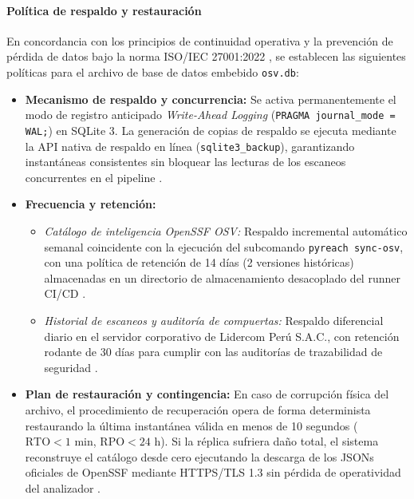 \paragraph*{Política de respaldo y restauración}
En concordancia con los principios de continuidad operativa y la prevención de pérdida de datos bajo la norma ISO/IEC 27001:2022 \cite{gutierrez2024auditoria, sommerville2016software}, se establecen las siguientes políticas para el archivo de base de datos embebido \texttt{osv.\allowbreak db}:

\begin{itemize}
    \item \textbf{Mecanismo de respaldo y concurrencia:} Se activa permanentemente el modo de registro anticipado \textit{Write-Ahead Logging} (\texttt{PRAGMA journal\_\allowbreak mode = WAL;}) en SQLite 3. La generación de copias de respaldo se ejecuta mediante la API nativa de respaldo en línea (\texttt{sqlite3\_\allowbreak backup}), garantizando instantáneas consistentes sin bloquear las lecturas de los escaneos concurrentes en el pipeline \cite{torres2026proyecto}.
    \item \textbf{Frecuencia y retención:}
    \begin{itemize}
        \item \textit{Catálogo de inteligencia OpenSSF OSV:} Respaldo incremental automático semanal coincidente con la ejecución del subcomando \texttt{pyreach sync-\allowbreak osv}, con una política de retención de 14 días (2 versiones históricas) almacenadas en un directorio de almacenamiento desacoplado del runner CI/CD \cite{openssf2023osv, gutierrez2024auditoria}.
        \item \textit{Historial de escaneos y auditoría de compuertas:} Respaldo diferencial diario en el servidor corporativo de Lidercom Perú S.A.C., con retención rodante de 30 días para cumplir con las auditorías de trazabilidad de seguridad \cite{gutierrez2024auditoria}.
    \end{itemize}
    \item \textbf{Plan de restauración y contingencia:} En caso de corrupción física del archivo, el procedimiento de recuperación opera de forma determinista restaurando la última instantánea válida en menos de 10 segundos ($\text{RTO} < 1\text{ min}$, $\text{RPO} < 24\text{ h}$). Si la réplica sufriera daño total, el sistema reconstruye el catálogo desde cero ejecutando la descarga de los JSONs oficiales de OpenSSF mediante HTTPS/TLS 1.3 sin pérdida de operatividad del analizador \cite{openssf2023osv}.
\end{itemize}

